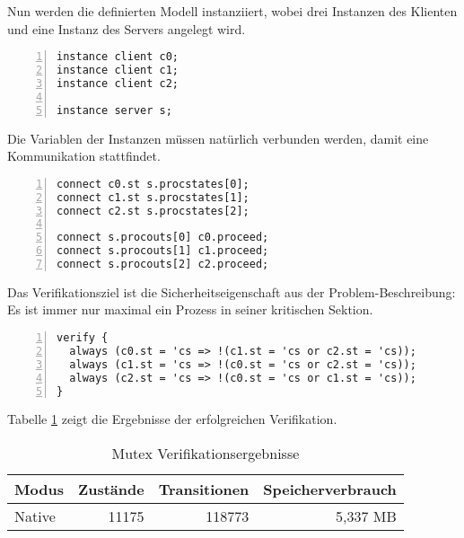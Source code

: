 Nun werden die definierten Modell instanziiert, wobei drei Instanzen des Klienten und eine Instanz des Servers angelegt wird.
\begin{lstlisting}[language=gtl,numbers=left,firstnumber=last]
instance client c0;
instance client c1;
instance client c2;

instance server s;
\end{lstlisting}
Die Variablen der Instanzen müssen natürlich verbunden werden, damit eine Kommunikation stattfindet.
\begin{lstlisting}[language=gtl,numbers=left,firstnumber=last]
connect c0.st s.procstates[0];
connect c1.st s.procstates[1];
connect c2.st s.procstates[2];

connect s.procouts[0] c0.proceed;
connect s.procouts[1] c1.proceed;
connect s.procouts[2] c2.proceed;
\end{lstlisting}
Das Verifikationsziel ist die Sicherheitseigenschaft aus der Problem-Beschreibung:
Es ist immer nur maximal ein Prozess in seiner kritischen Sektion.
\begin{lstlisting}[language=gtl,numbers=left,firstnumber=last]
verify {
  always (c0.st = 'cs => !(c1.st = 'cs or c2.st = 'cs));
  always (c1.st = 'cs => !(c0.st = 'cs or c2.st = 'cs));
  always (c2.st = 'cs => !(c0.st = 'cs or c1.st = 'cs));
}
\end{lstlisting}
Tabelle \ref{tab:mutex_results} zeigt die Ergebnisse der erfolgreichen Verifikation.
\begin{table}
  \centering
  \begin{tabular}{|l|r|r|r|}
    \hline
    \textbf{Modus} & \textbf{Zustände} & \textbf{Transitionen} & \textbf{Speicherverbrauch}\\
    \hline
    Native & 11175 & 118773 & 5,337 MB\\
    \hline
  \end{tabular}
  \caption{Mutex Verifikationsergebnisse}
  \label{tab:mutex_results}
\end{table}

